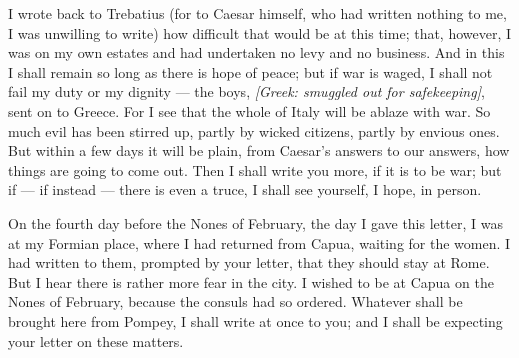  I wrote back to Trebatius (for to Caesar himself, who had written nothing to me, I was unwilling to write) how difficult that would be at this time; that, however, I was on my own estates and had undertaken no levy and no business. And in this I shall remain so long as there is hope of peace; but if war is waged, I shall not fail my duty or my dignity --- the boys, \textit{[Greek: smuggled out for safekeeping]}, sent on to Greece. For I see that the whole of Italy will be ablaze with war. So much evil has been stirred up, partly by wicked citizens, partly by envious ones. But within a few days it will be plain, from Caesar's answers to our answers, how things are going to come out. Then I shall write you more, if it is to be war; but if --- if instead --- there is even a truce, I shall see yourself, I hope, in person.

 On the fourth day before the Nones of February, the day I gave this letter, I was at my Formian place, where I had returned from Capua, waiting for the women. I had written to them, prompted by your letter, that they should stay at Rome. But I hear there is rather more fear in the city. I wished to be at Capua on the Nones of February, because the consuls had so ordered. Whatever shall be brought here from Pompey, I shall write at once to you; and I shall be expecting your letter on these matters.
